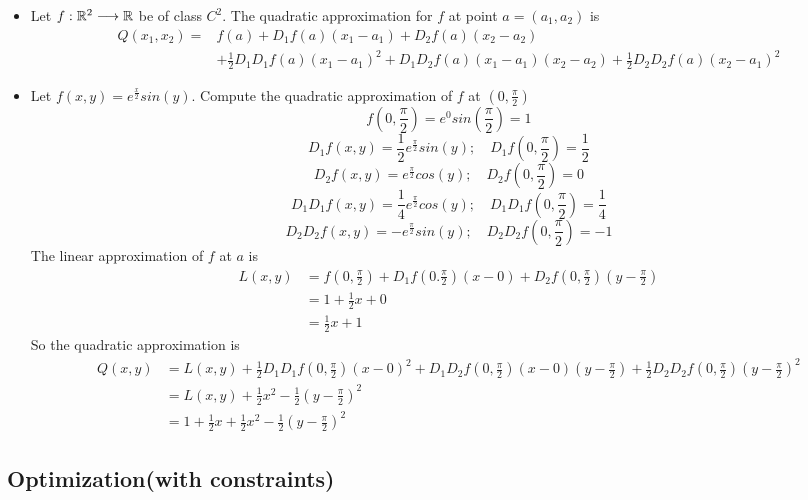 \begin{itemize}
    \item Let $f:\mathbb{R}^2 \longrightarrow \mathbb{R}$ be of class $C^2$. The quadratic approximation for $f$ at point $a=(a_1,a_2)$ is
    \begin{equation}
        \begin{split}
            Q(x_1,x_2)=&f(a)+D_1f(a)(x_1-a_1)+D_2f(a)(x_2-a_2)\\
            &+\frac{1}{2}D_1D_1f(a)(x_1-a_1)^2+D_1D_2f(a)(x_1-a_1)(x_2-a_2)+\frac{1}{2}D_2D_2f(a)(x_2-a_1)^2
        \end{split}
    \end{equation}
    \item Let $f(x,y)=e^{\frac{x}{2}}sin(y)$. Compute the quadratic approximation of $f$ at $(0,\frac{\pi}{2})$
    $$f(0,\frac{\pi}{2})=e^0sin(\frac{\pi}{2})=1$$
    $$D_1f(x,y)=\frac{1}{2}e^{\frac{\pi}{2}}sin(y);\quad D_1f(0,\frac{\pi}{2})=\frac{1}{2}$$
    $$D_2f(x,y)=e^{\frac{\pi}{2}}cos(y);\quad D_2f(0,\frac{\pi}{2})=0$$
    $$D_1D_1f(x,y)=\frac{1}{4}e^{\frac{\pi}{2}}cos(y);\quad D_1D_1f(0,\frac{\pi}{2})=\frac{1}{4}$$
    $$D_2D_2f(x,y)=-e^{\frac{\pi}{2}}sin(y);\quad D_2D_2f(0,\frac{\pi}{2})=-1$$
    The linear approximation of $f$ at $a$ is 
    \begin{equation}
        \begin{split}
            L(x,y)&=f(0,\frac{\pi}{2})+D_1f(0.\frac{\pi}{2})(x-0)+D_2f(0,\frac{\pi}{2})(y-\frac{\pi}{2})\\
            &=1 + \frac{1}{2}x+0\\
            &= \frac{1}{2}x+1
        \end{split}
    \end{equation}
    So the quadratic approximation is 
    \begin{equation}
        \begin{split}
            Q(x,y)&=L(x,y)+\frac{1}{2}D_1D_1f(0,\frac{\pi}{2})(x-0)^2+D_1D_2f(0,\frac{\pi}{2})(x-0)(y-\frac{\pi}{2})+\frac{1}{2}D_2D_2f(0,\frac{\pi}{2})(y-\frac{\pi}{2})^2\\
            &= L(x,y)+\frac{1}{2}x^2-\frac{1}{2}(y-\frac{\pi}{2})^2\\
            &= 1+\frac{1}{2}x+\frac{1}{2}x^2-\frac{1}{2}(y-\frac{\pi}{2})^2
        \end{split}
    \end{equation}
\end{itemize}

\subsection{Optimization(with constraints)}

